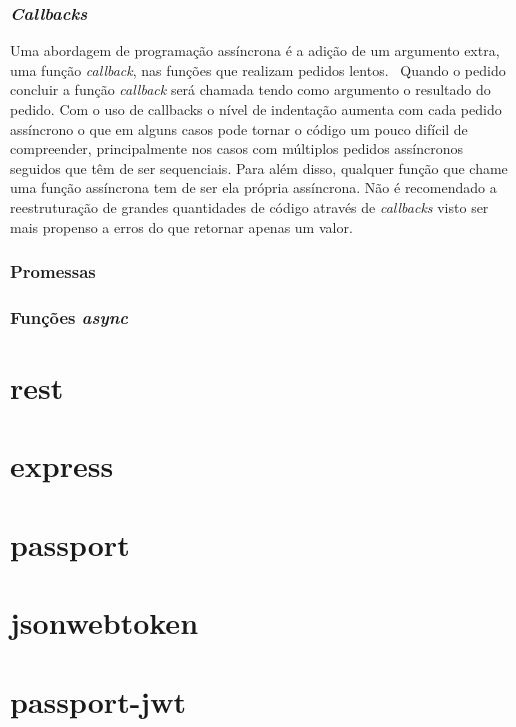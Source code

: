 \subsubsection{\textit{Callbacks}}
Uma abordagem de programação assíncrona é a adição de um argumento extra, uma função \textit{callback}, nas funções que realizam pedidos lentos.~\cite{elojs} Quando o pedido concluir a função \textit{callback} será chamada tendo como argumento o resultado do pedido. Com o uso de callbacks o nível de indentação aumenta com cada pedido assíncrono o que em alguns casos pode tornar o código um pouco difícil de compreender, principalmente nos casos com múltiplos pedidos assíncronos seguidos que têm de ser sequenciais. Para além disso, qualquer função que chame uma função assíncrona tem de ser ela própria assíncrona. Não é recomendado a reestruturação de grandes quantidades de código através de \textit{callbacks} visto ser mais propenso a erros do que retornar apenas um valor.

\subsubsection{Promessas}

\subsubsection{Funções \textit{async}}

\section{\acrshort{rest}}
\cite{restws}

\section{express}
\cite{wdmongo}

\section{passport}

\section{jsonwebtoken}

\section{passport-jwt}

